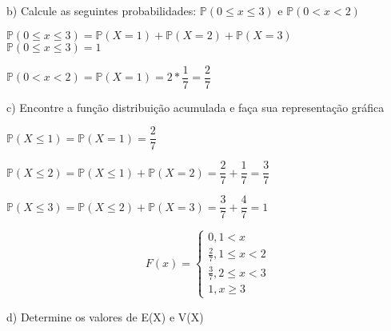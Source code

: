 \documentclass[12pt,a4paper]{article}
\begin{document}
\vspace{1cm}
b) Calcule as seguintes probabilidades: $\mathbb{P}(0\leq{x}\leq{3})$ e $\mathbb{P}(0<x<2)$

\vspace{0.25cm}
\begin{center}
	$\mathbb{P}(0\leq{x}\leq{3})= \mathbb{P}(X=1) + \mathbb{P}(X=2)+ \mathbb{P}(X=3)$
	\vspace{0.25cm}\\
	$\mathbb{P}(0\leq{x}\leq{3})=1$
	
	\vspace{1cm}
	$\mathbb{P}(0<x<2) = \mathbb{P}(X=1) = 2*\dfrac{1}{7} = \dfrac{2}{7}$
\end{center}

\vspace{1cm}
c) Encontre a função distribuição acumulada e faça sua representação gráfica

\begin{center}
	\vspace{0.25cm}
	$\mathbb{P}(X\leq{1}) = \mathbb{P}(X=1) = \dfrac{2}{7}$
	
	\vspace{0.5cm}
	$\mathbb{P}(X\leq2) = \mathbb{P}(X\leq{1}) + \mathbb{P}(X=2) = \dfrac{2}{7} + \dfrac{1}{7} = \dfrac{3}{7}$
	
	\vspace{0.5cm}
	$\mathbb{P}(X\leq{3}) = \mathbb{P}(X\leq2) + \mathbb{P}(X=3) = \dfrac{3}{7} + \dfrac{4}{7} = 1$
	
	\[
	F(x) =
	\begin{cases}
	0, 1 < x \\
	\frac{2}{7}, 1\leq{x} < 2 \\
	\frac{3}{7}, 2\leq{x} < 3\\
	1,x\geq{3}
	\end{cases}
	\]
	
	\vspace{1cm}
\end{center}

\vspace{1cm}
d) Determine os valores de E(X) e V(X)
\end{document}
